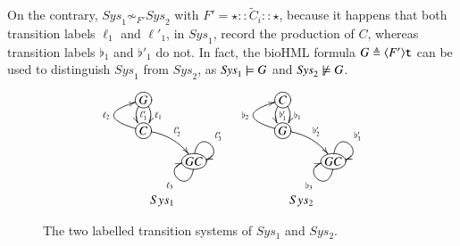 On the contrary, $\mathit{Sys}_1 \not \sim_{F'} \mathit{Sys}_2$  with $F' =  \star :: \widetilde{C}_i :: \star $, 
because it happens that both  transition labels $\ell_1$  and $\ell'_1$, in $\mathit{Sys}_1$, record the production of $C$, whereas 
transition labels $\flat_1$ and $\flat'_1$ do not.
In fact, the bioHML formula $G\triangleq \langle F'\rangle{\tt t}$ can be used to distinguish $\mathit{Sys}_1$ from $\mathit{Sys}_2$, as $\mathit{Sys}_1\models G$ and $\mathit{Sys}_2\not\models G$.

\begin{figure}
\[
\begin{array}{cc}
\xymatrix@R-1pc{
*+[o][F-]{G} \ar@/ ^/[d]^{\ell_1} \ar@/_/[d]^{\ell'_1} \\
*+[o][F-]{C} \ar@/^2pc/[u]^{\ell_2} \ar@/^/[dr]^{\ell'_2} \\ %
& *+[o][F-]{GC}\ar@(d,l)^{\ell_3}\ar@(u,r)^{\ell'_3}
}
&
\xymatrix@R-1pc{
*+[o][F-]{C} \ar@/ ^/[d]^{\flat_1} \ar@/_/[d]^{\flat'_1} \\
*+[o][F-]{G} \ar@/^2pc/[u]^{\flat_2} \ar@/^/[dr]^{\flat'_2} \\ 
& *+[o][F-]{GC}\ar@(d,l)^{\flat_3}\ar@(u,r)^{\flat'_3}
}\\
Sys_1 & Sys_2
\end{array}
\]
\caption{The two labelled transition systems of $Sys_1$ and $Sys_2$.}\label{fig:ltss}
\end{figure}